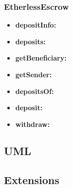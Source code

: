 \subsubsection{EtherlessEscrow}
	\begin{itemize}
		\item \textbf{depositInfo:}
		\item \textbf{deposits:}
	\end{itemize}
	\begin{itemize}
		\item \textbf{getBeneficiary:}
		\item \textbf{getSender:}
		\item \textbf{depositsOf:}
		\item \textbf{deposit:}
		\item \textbf{withdraw:}
	\end{itemize}

\subsection{UML}		
\subsection{Extensions}  %